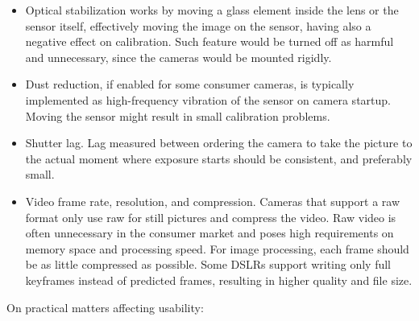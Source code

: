 \begin{itemize}
	\item Optical stabilization works by moving a glass element inside the lens or the sensor itself, effectively moving the image on the sensor, having also a negative effect on calibration. Such feature would be turned off as harmful and unnecessary, since the cameras would be mounted rigidly.

	\item Dust reduction, if enabled for some consumer cameras, is typically implemented as high-frequency vibration of the sensor on camera startup. Moving the sensor might result in small calibration problems.

	\item Shutter lag. Lag measured between ordering the camera to take the picture to the actual moment where exposure starts should be consistent, and preferably small.

	\item Video frame rate, resolution, and compression. Cameras that support a raw format only use raw for still pictures and compress the video. Raw video is often unnecessary in the consumer market and poses high requirements on memory space and processing speed. For image processing, each frame should be as little compressed as possible. Some DSLRs support writing only full keyframes instead of predicted frames, resulting in higher quality and file size.

\end{itemize}

On practical matters affecting usability:

